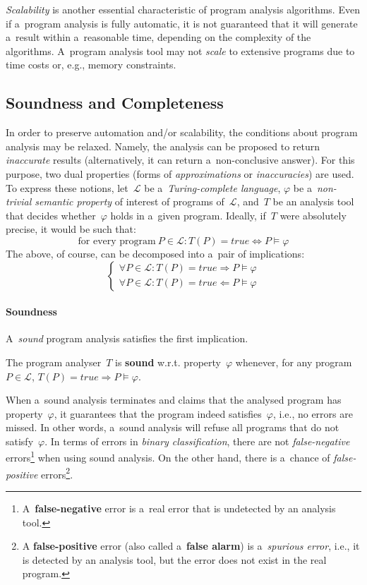 \emph{Scalability} is another essential characteristic of program analysis algorithms. Even if a~program analysis is fully automatic, it is not guaranteed that it will generate a~result within a~reasonable time, depending on the complexity of the algorithms. A~program analysis tool may not \emph{scale} to extensive programs due to time costs or, e.g., memory constraints.

\subsection{Soundness and Completeness}

In order to preserve automation and/or scalability, the conditions about program analysis may be relaxed. Namely, the analysis can be proposed to return \emph{inaccurate} results (alternatively, it can return a~non-conclusive  answer). For this purpose, two dual properties (forms of \emph{approximations} or \emph{inaccuracies}) are used. To express these notions, let~$ \mathcal{L} $ be a~\emph{Turing-complete language}, $ \varphi $ be a~\emph{non-trivial semantic property} of interest of programs of~$ \mathcal{L} $, and~$ T $ be an analysis tool that decides whether~$ \varphi $ holds in a~given program. Ideally, if~$ T $ were absolutely precise, it would be such that:
$$
    \text{for every program}\ P \in \mathcal{L}: T(P) = true \Longleftrightarrow P \models \varphi
$$
The above, of course, can be decomposed into a~pair of implications:
$$
    \begin{cases}
        \forall P \in \mathcal{L}: T(P) = true \Longrightarrow P \models \varphi \\
        \forall P \in \mathcal{L}: T(P) = true \Longleftarrow P \models \varphi
    \end{cases}
$$

\paragraph{Soundness}
A~\emph{sound} program analysis satisfies the first implication.
\begin{definition}
    The program analyser~$ T $ is \textbf{sound} w.r.t. property~$ \varphi $ whenever, for any program $ P \in \mathcal{L} $, $ T(P) = true \Longrightarrow P \models \varphi $.
\end{definition}
When a~sound analysis terminates and claims that the analysed program has property~$ \varphi $, it guarantees that the program indeed satisfies~$ \varphi $, i.e., no errors are missed. In other words, a~sound analysis will refuse all programs that do not satisfy~$ \varphi $. In terms of errors in \emph{binary classification}, there are not \emph{false-negative} errors\footnote{A~\textbf{false-negative} error is a~real error that is undetected by an analysis tool.} when using sound analysis. On the other hand, there is a~chance of \emph{false-positive} errors\footnote{A \textbf{false-positive} error (also called a~\textbf{false alarm}) is a~\emph{spurious error}, i.e., it is detected by an analysis tool, but the error does not exist in the real program.}.

